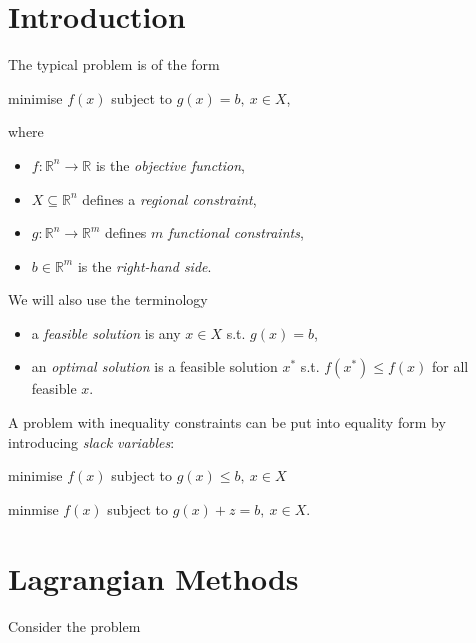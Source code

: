 \documentclass[a4paper]{article}
\begin{document}
\maketitle
\tableofcontents

\section{Introduction}

The typical problem is of the form

\begin{center}
  minimise $f(x)$ subject to $g(x) = b,\: x \in X$,
\end{center}

where

\begin{itemize}
\item $f : \mathbb{R}^n → \mathbb{R}$ is the \emph{objective function},
\item $X \subseteq \mathbb{R}^n$ defines a \emph{regional constraint},
\item $g: \mathbb{R}^n → \mathbb{R}^m$ defines $m$ \emph{functional constraints},
\item $b \in \mathbb{R}^m$ is the \emph{right-hand side}.
\end{itemize}

We will also use the terminology

\begin{itemize}
\item a \emph{feasible solution} is any $x \in X$ s.t. $g(x) = b$,
\item an \emph{optimal solution} is a feasible solution $x^*$ s.t. $f(x^*) ≤ f(x)$ for all feasible $x$.

\end{itemize}

A problem with inequality constraints can be put into equality form by introducing \emph{slack variables}:

\begin{center}
  minimise $f(x)$ subject to $g(x) ≤ b,\: x \in X$

  minmise $f(x)$ subject to $g(x) + z = b,\: x \in X$.
\end{center}

\section{Lagrangian Methods}

Consider the problem
\end{document}

